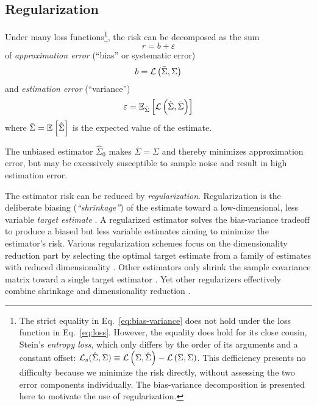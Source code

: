 \subsection*{Regularization}
Under many loss functions\footnote{
The strict equality in Eq.~\ref{eq:bias-variance} does not hold under the loss function in Eq.~\ref{eq:loss}. 
However, the equality does hold for its close cousin, Stein's \emph{entropy loss}, which only differs by the order of its arguments and a constant offset: $\mathcal L_s(\hat\Sigma,\Sigma) \equiv \loss{\Sigma,\hat\Sigma} - \loss{\Sigma,\Sigma}$. 
This defficiency presents no difficulty because we minimize the risk directly, without assessing the two error components individually. 
The bias-variance decomposition is presented here to motivate the use of regularization.}, 
the risk can be decomposed as the sum
\begin{equation}\label{eq:bias-variance}
    r = b + \varepsilon
\end{equation}
of \emph{approximation error} (``bias'' or systematic error)
\begin{equation}
   b = \loss{\bar\Sigma,\Sigma}
\end{equation}
and \emph{estimation error} (``variance'') 
\begin{equation}
   \varepsilon = \E[\hat\Sigma]{\loss{\hat\Sigma, \bar\Sigma}}
\end{equation}
where $\bar\Sigma = \E{\hat\Sigma}$ is the expected value of the estimate. 

The unbiased estimator $\hat\Sigma_0$ makes $\bar\Sigma=\Sigma$ and thereby minimizes approximation error, but may be excessively susceptible to sample noise and result in high estimation error.

The estimator risk can be reduced by \emph{regularization}. Regularization is the deliberate biasing (\emph{``shrinkage''}) of the estimate toward a low-dimensional, less variable \emph{target estimate} \cite{Bickel:2006,Ledoit:2004}. 
A regularized estimator solves the bias-variance tradeoff to produce a biased but less variable estimates aiming to minimize the estimator's risk.  
Various regularization schemes focus on the dimensionality reduction part  by selecting the optimal target estimate from a family of estimates with reduced dimensionality \cite{findit}.  
Other estimators only shrink the sample covariance matrix toward a single target estimator \cite{Schafer:2005}. 
Yet other regularizers effectively combine shrinkage and dimensionality reduction \cite{findit}.
